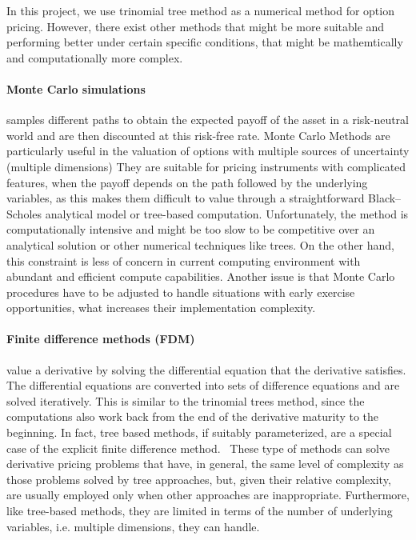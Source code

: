 
In this project, we use trinomial tree method as a numerical method for option pricing. However, there exist other methods that might be more suitable and performing better under certain specific conditions, that might be mathemtically and computationally more complex.

\paragraph{Monte Carlo simulations} samples different paths to obtain the expected payoff of the asset in a risk-neutral world and are then discounted at this risk-free rate. Monte Carlo Methods are particularly useful in the valuation of options with multiple sources of uncertainty (multiple dimensions) They are suitable for pricing instruments with complicated features, when the payoff depends on the path followed by the underlying variables, as this makes them difficult to value through a straightforward Black–Scholes analytical model or tree-based computation.  Unfortunately, the method is computationally intensive and might be too slow to be competitive over an analytical solution or other numerical techniques like trees. On the other hand, this constraint is less of concern in current computing environment with abundant and efficient compute capabilities. Another issue is that Monte Carlo procedures have to be adjusted to handle situations with early exercise opportunities, what increases their implementation complexity.~\cite[pg. 448]{ofod}  

\paragraph{Finite difference methods (FDM)} value a derivative by solving the differential equation that the derivative satisfies. The differential equations are converted into sets of difference equations and are solved iteratively. This is similar to the trinomial trees method, since the computations also work back from the end of the derivative maturity to the beginning. In fact, tree based methods, if suitably parameterized, are a special case of the explicit finite difference method.~\cite[pg.455 - 466]{ofod} These type of methods can solve derivative pricing problems that have, in general, the same level of complexity as those problems solved by tree approaches, but, given their relative complexity, are usually employed only when other approaches are inappropriate. Furthermore, like tree-based methods, they are limited in terms of the number of underlying variables, i.e. multiple dimensions, they can handle.


